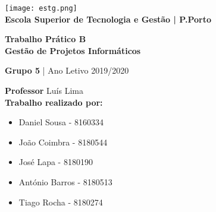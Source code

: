 \begin{titlepage}

\center

\texttt{[image: estg.png]}\\[1cm]
\textbf{Escola Superior de Tecnologia e Gestão | P.Porto}\\[0.5cm]

\vfill

\linespread{1.2}\huge {\bfseries Trabalho Prático B}\\[0.5cm]
\large{\textbf{Gestão de Projetos Informáticos}}

\normalsize{\textbf{Grupo 5} | Ano Letivo 2019/2020}

\vfill

\endcenter

\begin{flushleft}

\textbf{Professor} Luís Lima\\[0.65cm]

\textbf{\small Trabalho realizado por:}\\[0cm]

\begin{itemize}
	\item{\small Daniel Sousa - 8160334}\\[0cm]
	\item{\small João Coimbra - 8180544}\\[0cm]
	\item{\small José Lapa - 8180190}\\[0cm]
	\item{\small António Barros - 8180513}\\[0cm]
	\item{\small Tiago Rocha - 8180274}

\end{itemize}

\end{flushleft}

\end{titlepage}
